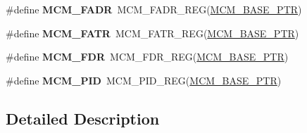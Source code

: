 \begin{DoxyCompactItemize}
\item 
\hypertarget{group___m_c_m___register___accessor___macros_ga55fb8adba2d525aecf5996c25c55d70a}{}\#define {\bfseries M\+C\+M\+\_\+\+F\+A\+D\+R}~M\+C\+M\+\_\+\+F\+A\+D\+R\+\_\+\+R\+E\+G(\hyperlink{group___m_c_m___peripheral_gad41e931f176c230831e3dbad45117841}{M\+C\+M\+\_\+\+B\+A\+S\+E\+\_\+\+P\+T\+R})\label{group___m_c_m___register___accessor___macros_ga55fb8adba2d525aecf5996c25c55d70a}

\item 
\hypertarget{group___m_c_m___register___accessor___macros_gaec513a63a3b9cc58960152ce0cd72202}{}\#define {\bfseries M\+C\+M\+\_\+\+F\+A\+T\+R}~M\+C\+M\+\_\+\+F\+A\+T\+R\+\_\+\+R\+E\+G(\hyperlink{group___m_c_m___peripheral_gad41e931f176c230831e3dbad45117841}{M\+C\+M\+\_\+\+B\+A\+S\+E\+\_\+\+P\+T\+R})\label{group___m_c_m___register___accessor___macros_gaec513a63a3b9cc58960152ce0cd72202}

\item 
\hypertarget{group___m_c_m___register___accessor___macros_gab60b79a13ff500b87f2b7607dda8a7c2}{}\#define {\bfseries M\+C\+M\+\_\+\+F\+D\+R}~M\+C\+M\+\_\+\+F\+D\+R\+\_\+\+R\+E\+G(\hyperlink{group___m_c_m___peripheral_gad41e931f176c230831e3dbad45117841}{M\+C\+M\+\_\+\+B\+A\+S\+E\+\_\+\+P\+T\+R})\label{group___m_c_m___register___accessor___macros_gab60b79a13ff500b87f2b7607dda8a7c2}

\item 
\hypertarget{group___m_c_m___register___accessor___macros_gab9a0a639f50dc58cb6b66a9b875dc898}{}\#define {\bfseries M\+C\+M\+\_\+\+P\+I\+D}~M\+C\+M\+\_\+\+P\+I\+D\+\_\+\+R\+E\+G(\hyperlink{group___m_c_m___peripheral_gad41e931f176c230831e3dbad45117841}{M\+C\+M\+\_\+\+B\+A\+S\+E\+\_\+\+P\+T\+R})\label{group___m_c_m___register___accessor___macros_gab9a0a639f50dc58cb6b66a9b875dc898}

\end{DoxyCompactItemize}


\subsection{Detailed Description}
